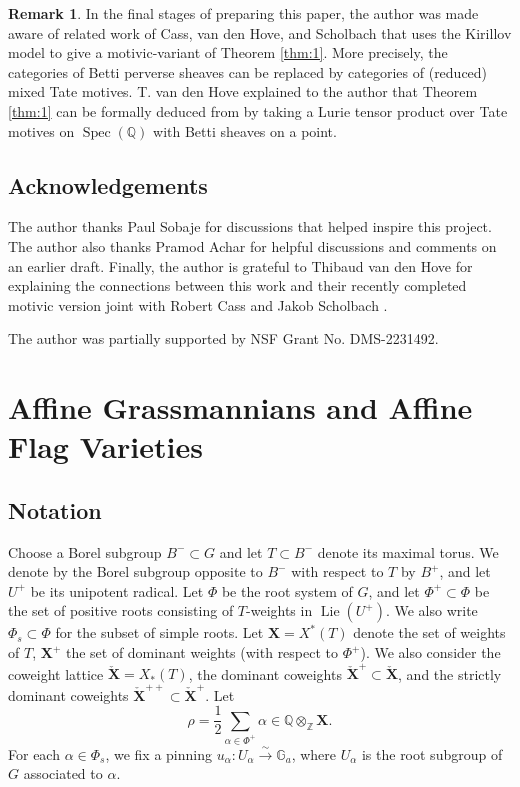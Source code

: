 \documentclass{amsart}
\newcommand{\Q}{\mathbb{Q}}
\newcommand{\Z}{\mathbb{Z}}
\newcommand{\G}{\mathbb{G}}
\newcommand{\bfX}{\mathbf{X}}
\newcommand{\bfXv}{\check{\mathbf{X}}}
\DeclareMathOperator{\Spec}{Spec}
\DeclareMathOperator{\Lie}{Lie}
\theoremstyle{definition}
\newtheorem{remark}[subsubsection]{Remark}
\begin{document}
    \begin{remark}
    In the final stages of preparing this paper, the author was made aware of related work of Cass, van den Hove, and Scholbach \cite{CvdHS} that uses the Kirillov model to give a motivic-variant of Theorem \ref{thm:1}.
    More precisely, the categories of Betti perverse sheaves can be replaced by categories of (reduced) mixed Tate motives.
    T. van den Hove explained to the author that Theorem \ref{thm:1} can be formally deduced from \cite[Theorem 1.6]{CvdHS} by taking a Lurie tensor product over Tate motives on $\Spec (\Q)$ with Betti sheaves on a point.
    \end{remark}

    \subsection{Acknowledgements}

    The author thanks Paul Sobaje for discussions that helped inspire this project. The author also thanks Pramod Achar for helpful discussions and comments on an earlier draft.
    Finally, the author is grateful to Thibaud van den Hove for explaining the connections between this work and their recently completed motivic version joint with Robert Cass and Jakob Scholbach \cite{CvdHS}.

    The author was partially supported by NSF Grant No. DMS-2231492.

    \section{Affine Grassmannians and Affine Flag Varieties}
        \subsection{Notation}

    Choose a Borel subgroup $B^{-} \subset G$ and let $T \subset B^{-}$ denote its maximal torus.
    We denote by the Borel subgroup opposite to $B^{-}$ with respect to $T$ by $B^+$, and let $U^{+}$ be its unipotent radical.
    Let $\Phi$ be the root system of $G$, and let $\Phi^+ \subset \Phi$ be the set of positive roots consisting of $T$-weights in $\Lie (U^+)$.
    We also write $\Phi_s \subset \Phi$ for the subset of simple roots.
    Let $\bfX = X^* (T)$ denote the set of weights of $T$, $\bfX^+$ the set of dominant weights (with respect to $\Phi^+$).
    We also consider the coweight lattice $\bfXv = X_* (T)$, the dominant coweights $\bfXv^{+} \subset \bfXv$, and the strictly dominant coweights $\bfXv^{++} \subset \bfXv^{+}$.
    Let
    \[\rho = \frac{1}{2}\sum_{\alpha \in \Phi^+} \alpha \in \Q \otimes_{\Z} \bfX.\]
    For each $\alpha \in \Phi_s$, we fix a pinning $u_{\alpha} : U_{\alpha} \stackrel{\sim}{\to} \G_a$, where $U_{\alpha}$ is the root subgroup of $G$ associated to $\alpha$.
\end{document}

